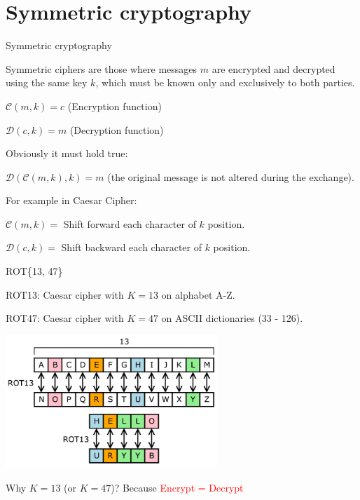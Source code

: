 \documentclass[handout, xcolor=dvipsnames,aspectratio=169]{beamer}
\begin{document}

\part{Symmetric cryptography}

\begin{frame}
  \partpage
  \centering
\end{frame}

\begin{frame}{Symmetric cryptography}

  \pause

  Symmetric ciphers are those where messages $ m $ are encrypted and decrypted using the same key $ k $, which must be known only and exclusively to both parties.

  \medskip

  \pause
  $\mathcal{C}(m, k) = c$ (Encryption function)

  $\mathcal{D}(c, k) = m$ (Decryption function)

  \medskip

  Obviously it must hold true:

  $\mathcal{D}(\mathcal{C}(m, k), k) = m$ (the original message is not altered during the exchange).

  \medskip
  \pause

  For example in Caesar Cipher:

  $\mathcal{C}(m, k) = $ Shift forward each character of $k$ position.

  $\mathcal{D}(c, k) = $ Shift backward each character of $k$ position.

\end{frame}

\begin{frame}{ROT\{13, 47\}}

  \centering

  \medskip

  ROT13: Caesar cipher with $ K = 13 $ on alphabet A-Z.

  ROT47: Caesar cipher with $ K = 47 $ on ASCII dictionaries (33 - 126).

  \medskip

  \includegraphics[width=8cm]{img/ROT13.png}

  \medskip

  Why $K = 13$ (or $K = 47$)?
  Because \textcolor{red}{Encrypt = Decrypt}

\end{frame}
\end{document}
